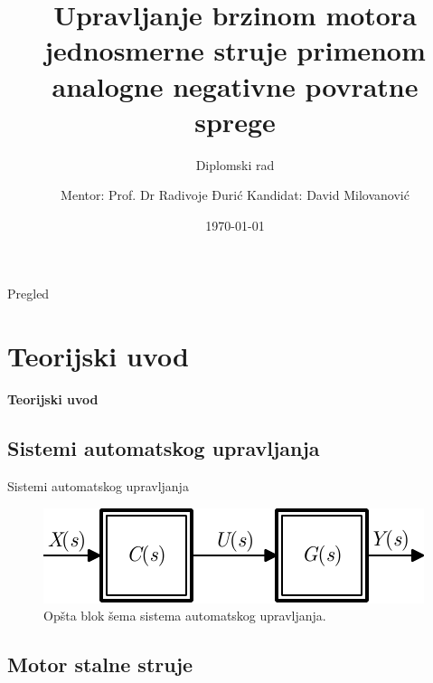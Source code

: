 \documentclass[aspectratio=169,xcolor=dvipsnames]{beamer}
\title[short title]{Upravljanje brzinom motora jednosmerne struje primenom analogne negativne povratne sprege} %
\subtitle{Diplomski rad}
\author {Mentor: Prof. Dr Radivoje Đurić
\qquad\qquad
\hfill Kandidat: David Milovanović
}
\institute[NTU] %
{
    Univerzitet u Beogradu \\
    Elektrotehnički fakultet %
}
\date{\today} %
\begin{document}
\begin{frame}
    \titlepage
\end{frame}

\begin{frame}{Pregled}
    \tableofcontents
\end{frame}

\section{Teorijski uvod}

\begin{frame}
    \Huge{\centerline{\textbf{Teorijski uvod}}}
\end{frame}


\subsection{Sistemi automatskog upravljanja}

\begin{frame}{Sistemi automatskog upravljanja}
    \begin{figure}
    \includegraphics[width=0.6\linewidth]{fig/sau.pdf}
    \caption{Opšta blok šema sistema automatskog upravljanja.}
    \end{figure}
\end{frame}

\subsection{Motor stalne struje}
\end{document}
